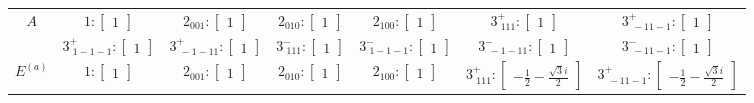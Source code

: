 \documentclass[fleqn,8pt,landscape]{jsarticle}
\begin{document}
\begin{longtable}{ccccccc}
$ A $ & $ 1:\begin{bmatrix} 1 \end{bmatrix} $ & $ 2{}_{001}:\begin{bmatrix} 1 \end{bmatrix} $ & $ 2{}_{010}:\begin{bmatrix} 1 \end{bmatrix} $ & $ 2{}_{100}:\begin{bmatrix} 1 \end{bmatrix} $ & $ 3^{+}_{\,\,111}:\begin{bmatrix} 1 \end{bmatrix} $ & $ 3^{+}_{\,\,-11-1}:\begin{bmatrix} 1 \end{bmatrix} $ \\
& $ 3^{+}_{\,\,1-1-1}:\begin{bmatrix} 1 \end{bmatrix} $ & $ 3^{+}_{\,\,-1-11}:\begin{bmatrix} 1 \end{bmatrix} $ & $ 3^{-}_{\,\,111}:\begin{bmatrix} 1 \end{bmatrix} $ & $ 3^{-}_{\,\,1-1-1}:\begin{bmatrix} 1 \end{bmatrix} $ & $ 3^{-}_{\,\,-1-11}:\begin{bmatrix} 1 \end{bmatrix} $ & $ 3^{-}_{\,\,-11-1}:\begin{bmatrix} 1 \end{bmatrix} $ \\ \hline
$ E^{(a)} $ & $ 1:\begin{bmatrix} 1 \end{bmatrix} $ & $ 2{}_{001}:\begin{bmatrix} 1 \end{bmatrix} $ & $ 2{}_{010}:\begin{bmatrix} 1 \end{bmatrix} $ & $ 2{}_{100}:\begin{bmatrix} 1 \end{bmatrix} $ & $ 3^{+}_{\,\,111}:\begin{bmatrix} - \frac{1}{2} - \frac{\sqrt{3} i}{2} \end{bmatrix} $ & $ 3^{+}_{\,\,-11-1}:\begin{bmatrix} - \frac{1}{2} - \frac{\sqrt{3} i}{2} \end{bmatrix} $ \\

\end{longtable}
\end{document}
